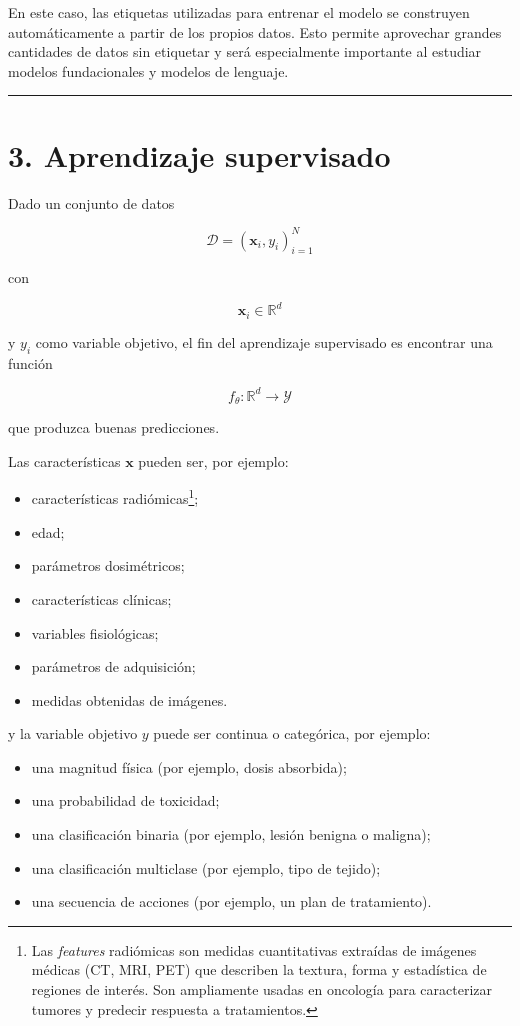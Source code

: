\documentclass[
  letterpaper,
  DIV=11,
  numbers=noendperiod]{scrartcl}
\providecommand{\tightlist}{%
  \setlength{\itemsep}{0pt}\setlength{\parskip}{0pt}}
\begin{document}
En este caso, las etiquetas utilizadas para entrenar el modelo se
construyen automáticamente a partir de los propios datos. Esto permite
aprovechar grandes cantidades de datos sin etiquetar y será
especialmente importante al estudiar modelos fundacionales y modelos de
lenguaje.

\begin{center}\rule{0.5\linewidth}{0.5pt}\end{center}

\section{3. Aprendizaje supervisado}\label{aprendizaje-supervisado}

Dado un conjunto de datos

\[
\mathcal{D} = {(\mathbf{x}_i,y_i)}_{i=1}^{N}
\]

con

\[
\mathbf{x}_i \in \mathbb{R}^d
\]

y \(y_i\) como variable objetivo, el fin del aprendizaje supervisado es
encontrar una función

\[
f_\theta:\mathbb{R}^d\rightarrow\mathcal{Y}
\]

que produzca buenas predicciones.

Las características \(\mathbf{x}\) pueden ser, por ejemplo:

\begin{itemize}
\tightlist
\item
  características radiómicas\footnote{Las \emph{features} radiómicas son
    medidas cuantitativas extraídas de imágenes médicas (CT, MRI, PET)
    que describen la textura, forma y estadística de regiones de
    interés. Son ampliamente usadas en oncología para caracterizar
    tumores y predecir respuesta a tratamientos.};
\item
  edad;
\item
  parámetros dosimétricos;
\item
  características clínicas;
\item
  variables fisiológicas;
\item
  parámetros de adquisición;
\item
  medidas obtenidas de imágenes.
\end{itemize}

y la variable objetivo \(y\) puede ser continua o categórica, por
ejemplo:

\begin{itemize}
\tightlist
\item
  una magnitud física (por ejemplo, dosis absorbida);
\item
  una probabilidad de toxicidad;
\item
  una clasificación binaria (por ejemplo, lesión benigna o maligna);
\item
  una clasificación multiclase (por ejemplo, tipo de tejido);
\item
  una secuencia de acciones (por ejemplo, un plan de tratamiento).
\end{itemize}
\end{document}
